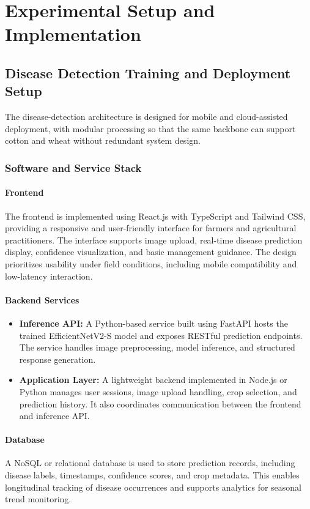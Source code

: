 \documentclass[12pt,a4paper]{report}
\begin{document}
\section{Experimental Setup and Implementation}

\subsection{Disease Detection Training and Deployment Setup}
The disease-detection architecture is designed for mobile and cloud-assisted deployment, with modular processing so that the same backbone can support cotton and wheat without redundant system design.

\subsubsection{Software and Service Stack}

\paragraph{Frontend}
The frontend is implemented using React.js with TypeScript and Tailwind CSS, providing a responsive and user-friendly interface for farmers and agricultural practitioners. The interface supports image upload, real-time disease prediction display, confidence visualization, and basic management guidance. The design prioritizes usability under field conditions, including mobile compatibility and low-latency interaction.

\paragraph{Backend Services}
\begin{itemize}
\item \textbf{Inference API:} A Python-based service built using FastAPI hosts the trained EfficientNetV2-S model and exposes RESTful prediction endpoints. The service handles image preprocessing, model inference, and structured response generation.
\item \textbf{Application Layer:} A lightweight backend implemented in Node.js or Python manages user sessions, image upload handling, crop selection, and prediction history. It also coordinates communication between the frontend and inference API.
\end{itemize}

\paragraph{Database}
A NoSQL or relational database is used to store prediction records, including disease labels, timestamps, confidence scores, and crop metadata. This enables longitudinal tracking of disease occurrences and supports analytics for seasonal trend monitoring.
\end{document}
